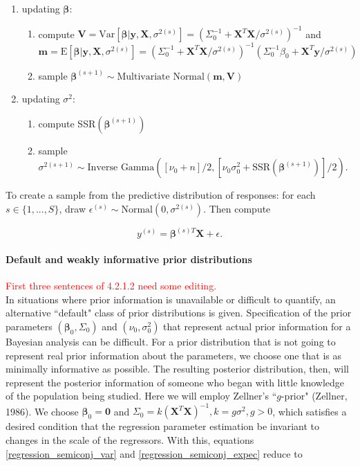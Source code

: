 \documentclass[12pt, a4paper]{article}
\begin{document}
\begin{enumerate}
    \item updating $\boldsymbol\beta$:
    \begin{enumerate}
        \item compute $\mathbf{V} = \text{Var}[\boldsymbol\beta|\mathbf{y,X},\sigma^{2(s)}] = \left(\Sigma_0^{-1} + \mathbf{X}^T\mathbf{X}/\sigma^{2(s)}\right)^{-1}$ and \\$\mathbf{m} = \text{E}[\boldsymbol\beta|\mathbf{y,X},\sigma^{2(s)}] = \left(\Sigma_0^{-1} + \mathbf{X}^T\mathbf{X}/\sigma^{2(s)}\right)^{-1}\left(\Sigma_0^{-1}\beta_0 + \mathbf{X}^T\mathbf{y}/\sigma^{2(s)}\right)$
        \item sample $\boldsymbol\beta^{(s+1)} \sim \text{Multivariate Normal}(\mathbf{m,V})$
    \end{enumerate}
    \item updating $\sigma^2$:
    \begin{enumerate}
        \item compute SSR$(\boldsymbol\beta^{(s+1)})$
        \item sample $\sigma^{2(s+1)} \sim \text{Inverse Gamma}([\nu_0 + n]/2,[\nu_0\sigma_0^2 + \text{SSR}(\boldsymbol\beta^{(s+1)})]/2)$.
    \end{enumerate}
\end{enumerate}

To create a sample from the predictive distribution of responses:  for each $s\in\{1,...,S\}$, draw $\epsilon^{(s)} \sim \text{Normal}(0,\sigma^{2(s)})$.  Then compute

$$y^{(s)} = \boldsymbol\beta^{(s)T}\mathbf{X} + \epsilon.$$

    \paragraph{Default and weakly informative prior distributions}
    \textcolor{red}{First three sentences of 4.2.1.2 need some editing.}\\
    In situations where prior information is unavailable or difficult to quantify, an alternative ``default" class of prior distributions is given. Specification of the prior parameters $(\boldsymbol\beta_0, \Sigma_0)$ and $(\nu_0,\sigma^2_0)$ that represent actual prior information for a Bayesian analysis can be difficult.  For a prior distribution that is not going to represent real prior information about the parameters, we choose one that is as minimally informative as possible.  The resulting posterior distribution, then, will represent the posterior information of someone who began with little knowledge of the population being studied.  Here we will employ Zellner's ``$g$-prior" (Zellner, 1986).  We choose $\boldsymbol\beta_0 = \mathbf{0}$ and $\Sigma_0 = k(\mathbf{X}^T\mathbf{X})^{-1}, k = g\sigma^2, g > 0$, which satisfies a desired condition that the regression parameter estimation be invariant to changes in the scale of the regressors.  With this, equations \ref{regression_semiconj_var} and \ref{regression_semiconj_expec} reduce to
\end{document}
